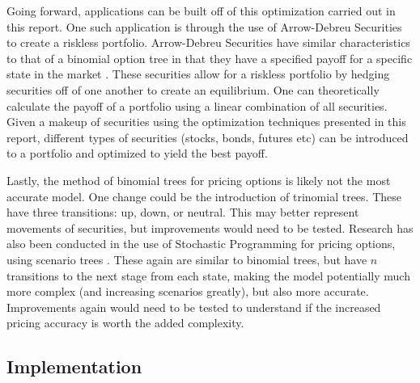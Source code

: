 \documentclass[12pt]{article}
\begin{document}
Going forward, applications can be built off of this optimization carried out in this report. One such application is through the use of Arrow-Debreu Securities to create a riskless portfolio. Arrow-Debreu Securities have similar characteristics to that of a binomial option tree in that they have a specified payoff for a specific state in the market \cite{tirole2010theory, AD_secs}. These securities allow for a riskless portfolio by hedging securities off of one another to create an equilibrium. One can theoretically calculate the payoff of a portfolio using a linear combination of all securities. Given a makeup of securities using the optimization techniques presented in this report, different types of securities (stocks, bonds, futures etc) can be introduced to a portfolio and optimized to yield the best payoff.
	
Lastly, the method of binomial trees for pricing options is likely not the most accurate model. One change could be the introduction of trinomial trees. These have three transitions: up, down, or neutral. This may better represent movements of securities, but improvements would need to be tested. Research has also been conducted in the use of Stochastic Programming for pricing options, using scenario trees \cite{stoc_prog_option}. These again are similar to binomial trees, but have $n$ transitions to the next stage from each state, making the model potentially much more complex (and increasing scenarios greatly), but also more accurate. Improvements again would need to be tested to understand if the increased pricing accuracy is worth the added complexity.


\newpage
{}





\newpage
\begin{appendices}
\section{Implementation} \label{ap:code}

\end{appendices}
\end{document}
